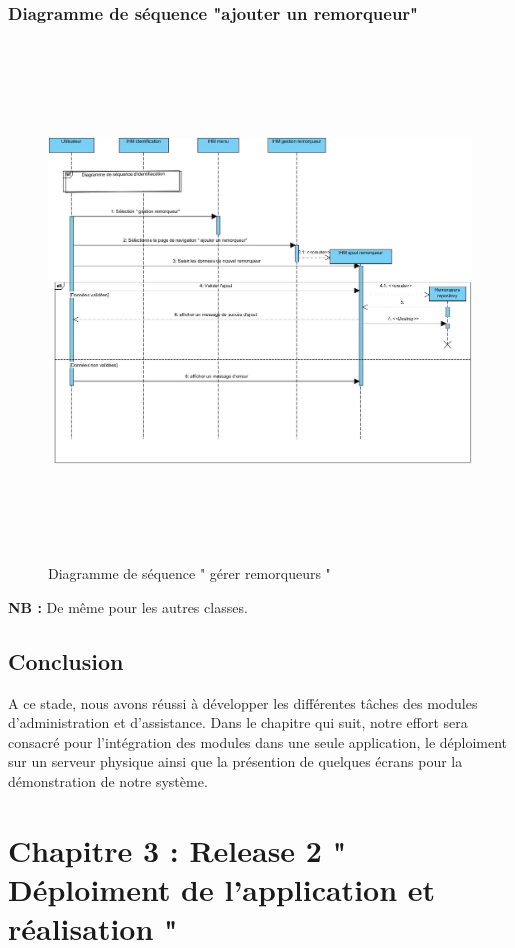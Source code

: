 \documentclass{article}
\begin{document}
\subsubsection{Diagramme de séquence "ajouter un remorqueur"}
\begin{figure}[H]
\centering
\includegraphics[height=5.4in]{DiagSeqAjouterRemorqueur.jpg}
\caption[Figure15 : Diagramme de séquence " gérer remorqueurs "]{Diagramme de séquence " gérer remorqueurs "}
\label{fig:pic15}
\end{figure}
\textbf{NB : } De même pour les autres classes.
\cleardoublepage
\subsection{Conclusion} 
A ce stade, nous avons réussi à développer les différentes tâches des modules d'administration et d'assistance. Dans le chapitre qui suit, notre effort sera consacré pour l'intégration des modules dans une seule application, le déploiment sur un serveur physique ainsi que la présention de quelques écrans pour la démonstration de
notre système.
\cleardoublepage
\setcounter{section}{3}
\setcounter{subsection}{0}
\section*{Chapitre 3 :  Release 2 " Déploiment de l'application et réalisation "}
\end{document}
